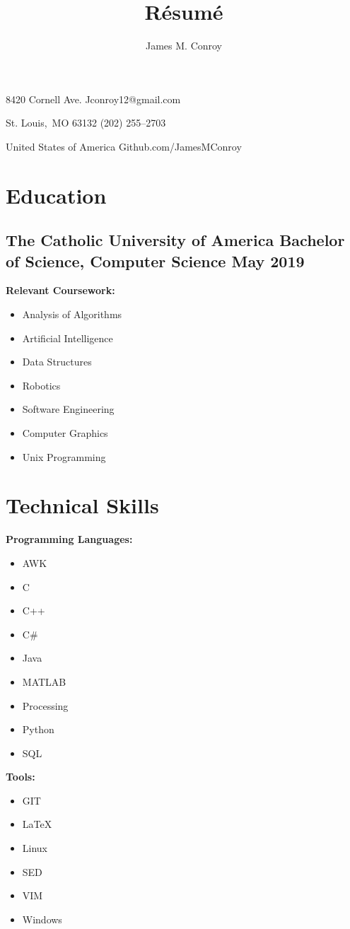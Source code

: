 \documentclass[11pt, a4paper]{article}
\author{James M. Conroy}
\title{R\'esum\'e}
\makeatletter
\renewcommand{\maketitle} {
	\begin{center}
	{\Large\bfseries
	\theauthor}

	\end{center}

	\setlength{\parindent}{0pt}
	\setlength{\parskip}{0em}
	8420 Cornell Ave.
	\hfill Jconroy12@gmail.com

	St. Louis,\ MO 63132
	\hfill (202) 255--2703

	United States of America
	\hfill Github.com/JamesMConroy
}
\makeatother
\begin{document}
\maketitle
\section{Education}
\subsection{The Catholic University of America \hspace {5pt} Bachelor of Science, Computer Science \hfill  May 2019 }

\noindent
\textbf{Relevant Coursework:}
\begin{multicols}{2}
	\begin{itemize}
	\item Analysis of Algorithms
	\item Artificial Intelligence
	\item Data Structures
	\item Robotics
	\item Software Engineering
	\item Computer Graphics
	\item Unix Programming
	\end{itemize}
\end{multicols}

\section{Technical Skills}
\textbf{Programming Languages:}
\begin{multicols}{3}
	\begin{itemize}
		\item AWK
		\item C
		\item C++
		\item C\#
		\item Java
		\item MATLAB
		\item Processing
		\item Python
		\item SQL
	\end{itemize}
\end{multicols}
\textbf{Tools:}
\begin{multicols}{3}
	\begin{itemize}
	\item GIT
	\item \LaTeX
	\item Linux
	\item SED
	\item VIM
	\item Windows
	\end{itemize}
\end{multicols}
\end{document}
